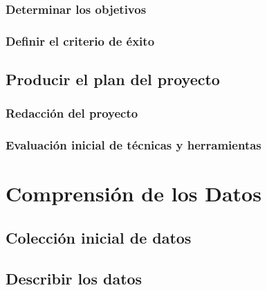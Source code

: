 \documentclass[11pt,a4paper,twoside]{tesis}
\begin{document}
\subsection{Determinar los objetivos}

\subsection{Definir el criterio de éxito}
\section{Producir el plan del proyecto}

\subsection{Redacción del proyecto}
\subsection{Evaluación inicial de técnicas y herramientas}


\chapter{Comprensión de los Datos}
\section{Colección inicial de datos}
\section{Describir los datos}
\end{document}
